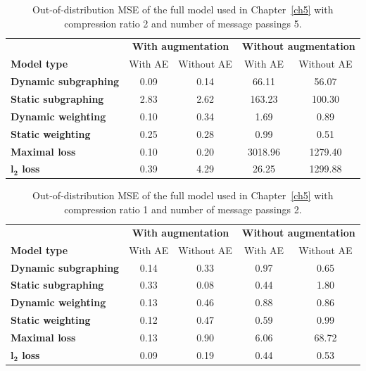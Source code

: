 \begin{appendices}
\begin{table}
\centering
\caption{Out-of-distribution MSE of the full model used in Chapter~\ref{ch5} with compression ratio 2 and number of message passings 5.}
\label{table_2_5}
\begin{tabular}{lcccc}
\toprule
 & \multicolumn{2}{c}{\textbf{With augmentation}} & \multicolumn{2}{c}{\textbf{Without augmentation}} \\
 \cmidrule{2-3} \cmidrule{4-5}
\textbf{Model type} & With AE & Without AE & With AE & Without AE \\
\midrule
\textbf{Dynamic subgraphing} & 0.09 & 0.14 & 66.11 & 56.07 \\
\textbf{Static subgraphing} & 2.83 & 2.62 & 163.23 & 100.30 \\
\textbf{Dynamic weighting} & 0.10 & 0.34 & 1.69 & 0.89 \\
\textbf{Static weighting} & 0.25 & 0.28 & 0.99 & 0.51 \\
\textbf{Maximal loss} & 0.10 & 0.20 & 3018.96 & 1279.40 \\
\textbf{$\boldsymbol{l_2}$ loss} & 0.39 & 4.29 & 26.25 & 1299.88 \\
\bottomrule
\end{tabular}
\end{table}

\begin{table}
\centering
\caption{Out-of-distribution MSE of the full model used in Chapter~\ref{ch5} with compression ratio 1 and number of message passings 2.}
\label{table_1_2}
\begin{tabular}{lcccc}
\toprule
 & \multicolumn{2}{c}{\textbf{With augmentation}} & \multicolumn{2}{c}{\textbf{Without augmentation}} \\
 \cmidrule{2-3} \cmidrule{4-5}
\textbf{Model type} & With AE & Without AE & With AE & Without AE \\
\midrule
\textbf{Dynamic subgraphing} & 0.14 & 0.33 & 0.97 & 0.65 \\
\textbf{Static subgraphing} & 0.33 & 0.08 & 0.44 & 1.80 \\
\textbf{Dynamic weighting} & 0.13 & 0.46 & 0.88 & 0.86 \\
\textbf{Static weighting} & 0.12 & 0.47 & 0.59 & 0.99 \\
\textbf{Maximal loss} & 0.13 & 0.90 & 6.06 & 68.72 \\
\textbf{$\boldsymbol{l_2}$ loss} & 0.09 & 0.19 & 0.44 & 0.53 \\
\bottomrule
\end{tabular}
\end{table}


\end{appendices}
